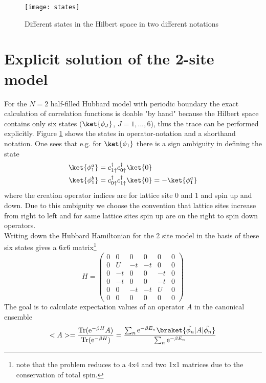 
	\begin{figure}[H]
		\centering
		\texttt{[image: states]} \qquad \qquad 
		\caption{Different states in the Hilbert space in two different notations}
		\label{fig1}
	\end{figure}
\section{Explicit solution of the 2-site model}
For the $N=2$ half-filled Hubbard model with periodic boundary the exact calculation of correlation functions is doable "by hand" because the Hilbert space contains only six states ($\ket{\phi_J}$, $J=1,...,6$), thus the trace can be performed explicitly. Figure \ref{fig1} shows the states in operator-notation and a shorthand notation. One sees that e.g. for $\ket{\phi_1}$ there is a sign ambiguity in defining the state
\begin{align*}
	\ket{\phi_1^a} &= c^{\dagger}_{1\uparrow}c^{\dagger}_{0\uparrow}\ket{0} \\
	\ket{\phi_1^b} &= c^{\dagger}_{0\uparrow}c^{\dagger}_{1\uparrow}\ket{0} = -\ket{\phi_1^a} 
\end{align*}
where the creation operator indices are for lattice site 0 and 1 and spin up and down. Due to this ambiguity we choose the convention that lattice sites increase from right to left and for same lattice sites spin up are on the right to spin down operators.\\ Writing down the Hubbard Hamiltonian for the 2 site model in the basis of these six states gives a $6x6$ matrix\footnote{note that the problem reduces to a 4x4 and two 1x1 matrices due to the conservation of total spin.}
\begin{equation*}
	H=
\begin{pmatrix}
	0 & 0 & 0&0&0&0\\
	0 & U & -t&-t&0&0\\
	0 & -t & 0&0&-t&0\\
	0 & -t & 0&0&-t&0\\
	0 & 0 & -t&-t&U&0\\
	0 & 0 & 0&0&0&0 
\end{pmatrix}
\end{equation*}
The goal is to calculate expectation values of an operator $A$ in the canonical ensemble
\begin{equation}
	<A> = \frac{\text{Tr}(\text{e}^{-\beta H}A)}{\text{Tr}(\text{e}^{-\beta H})} = \frac{\sum_{n}^{}\text{e}^{-\beta E_n}\braket{\tilde{\phi_n}|A|\tilde{\phi_n}}}{\sum_{n}^{}\text{e}^{-\beta E_n}}\label{expvalue}
\end{equation}
